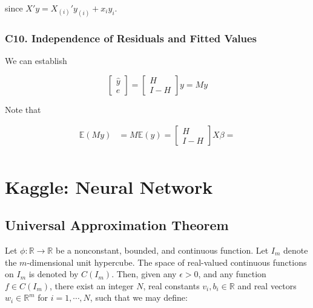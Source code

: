 \documentclass[12pt]{article}
\begin{document}
since $X'y = X_{(i)}' y_{(i)} + x_i y_i$. 


\subsubsection*{C10. Independence of Residuals and Fitted Values }


We can establish 

$$
\begin{bmatrix} \hat{y} \\ e \end{bmatrix} = \begin{bmatrix} H \\ I - H \end{bmatrix} y = My
$$

Note that 


$$
\begin{aligned}
\mathbb{E} ( My ) &= M \mathbb{E} ( y ) = \begin{bmatrix} H \\ I - H \end{bmatrix} X\beta =  \\[12pt]
\end{aligned}
$$




\pagebreak

\section*{Kaggle: Neural Network}

\setcounter{section}{1}
\setcounter{subsection}{0}


\subsection{Universal Approximation Theorem}

Let $\phi : \mathbb {R} \to \mathbb {R}$ be a nonconstant, bounded, and continuous function. Let $I_m$ denote the $m$-dimensional unit hypercube. The space of real-valued continuous functions on $I_m$ is denoted by  $C(I_m)$. Then, given any $\epsilon >0$, and any function $f \in C(I_m)$, there exist an integer $N$, real constants $v_i, b_i \in \mathbb {R}$ and real vectors $w_i\in \mathbb {R}^m$ for $i=1,\cdots ,N$, such that we may define:
\end{document}
